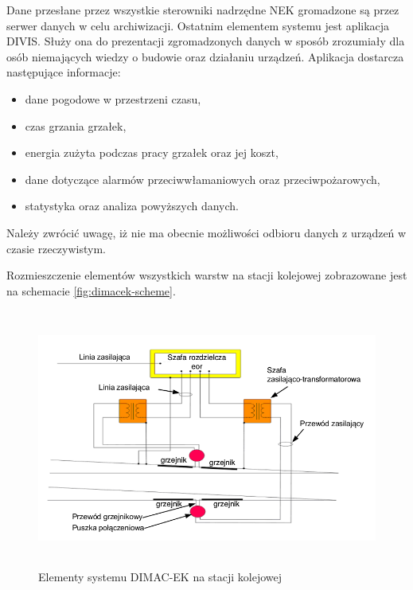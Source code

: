 Dane przesłane przez wszystkie sterowniki nadrzędne NEK gromadzone są przez serwer danych w celu archiwizacji. Ostatnim elementem systemu jest aplikacja DIVIS. Służy ona do prezentacji zgromadzonych danych w sposób zrozumiały dla osób niemających wiedzy o budowie oraz działaniu urządzeń. Aplikacja dostarcza następujące informacje:


\begin{itemize}
\item dane pogodowe w przestrzeni czasu,
\item czas grzania grzałek,
\item energia zużyta podczas pracy grzałek oraz jej koszt,
\item dane dotyczące alarmów przeciwwłamaniowych oraz przeciwpożarowych,
\item statystyka oraz analiza powyższych danych.
\end{itemize}

Należy zwrócić uwagę, iż nie ma obecnie możliwości odbioru danych z urządzeń w czasie rzeczywistym.

Rozmieszczenie elementów wszystkich warstw na stacji kolejowej zobrazowane jest na schemacie \ref{fig:dimacek-scheme}.

\begin{figure}[t]
	\includegraphics[height=85mm]{./img/dimacek_tory.png}
	\caption[Elementy systemu DIMAC-EK na stacji kolejowej]{Elementy systemu DIMAC-EK na stacji kolejowej \cite{arex-materials}}
	\label{fig:dimacek_tory}
\end{figure}

